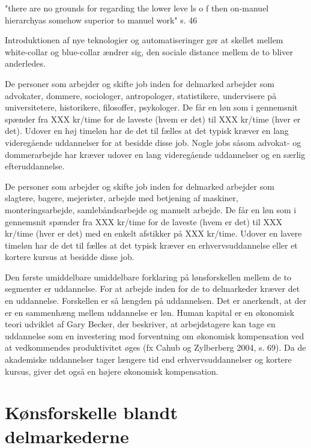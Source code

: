 "there are no grounds for regarding the lower leve ls o f  then on-manuel  hierarchyas somehow superior to manuel work" s. 46

Introduktionen af nye teknologier og automatiseringer gør at skellet mellem white-collar og blue-collar ændrer sig, den sociale distance mellem de to bliver anderledes. 




\iffalse
\label{iffalse}





De personer som arbejder og skifte job inden for delmarked  arbejder som advokater, dommere, sociologer, antropologer, statistikere, undervisere på universitetere, historikere, filosoffer, psykologer. De får en løn som i gennemsnit spænder fra XXX kr/time for de laveste (hvem er det) til XXX kr/time (hver er det). Udover en høj timeløn har de det til fælles at det typisk kræver en lang videregående uddannelser for at besidde disse job. Nogle jobs såsom advokat- og dommerarbejde har kræver udover en lang videregående uddannelser og en særlig efteruddannelse.

De personer som arbejder og skifte job inden for delmarked  arbejder som slagtere, bagere, mejerister, arbejde med betjening af maskiner, monteringsarbejde, samlebåndsarbejde og manuelt arbejde. De får en løn som i gennemsnit spænder fra XXX kr/time for de laveste (hvem er det) til XXX kr/time (hver er det) med en enkelt afstikker på XXX kr/time. Udover en lavere timeløn har de det til fælles at det typisk kræver en erhvervsuddannelse eller et kortere kursus at besidde disse job.

Den første umiddelbare umiddelbare forklaring på lønsforskellen mellem de to segmenter er uddannelse. For at arbejde inden for de to delmarkeder kræver det en uddannelse. Forskellen er så længden på uddannelsen. Det er anerkendt, at der er en sammenhæng mellem uddannelse er løn. Human kapital er en økonomisk teori udviklet af Gary Becker, der beskriver, at arbejdstagere kan tage en uddannelse som en investering mod forventning om økonomisk kompensation ved at vedkommendes produktivitet øges (fx Cahub og Zylberberg 2004, s. 69). Da de akademiske uddannelser tager længere tid end erhvervsuddannelser og kortere kursus, giver det også en højere økonomisk kompensation. 


\newpage \section{Kønsforskelle blandt delmarkederne \label{sec_delanalyse2_loen}}



